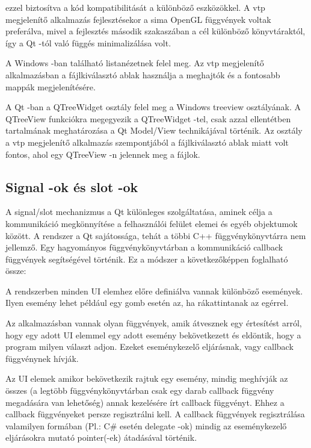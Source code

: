 \begin{sloppypar}
\begin{description}[font=\normalfont\itshape\bfseries\space]
ezzel biztosítva a kód kompatibilitását a különböző eszközökkel. 
A vtp megjelenítő alkalmazás fejlesztésekor 
a sima OpenGL függvények voltak preferálva,
mivel a fejlesztés második szakaszában a cél különböző könyvtáraktól, 
így a Qt -tól való függés minimalizálása volt.
\item [QListWidget:] 
A Windows -ban található listanézetnek felel meg. 
Az vtp megjelenítő alkalmazásban 
a fájlkiválasztó ablak használja a meghajtók és 
a fontosabb mappák megjelenítésére.
\item [QTreeView:] 
A Qt -ban a {\ttfamily QTreeWidget} osztály felel meg 
a Windows treeview osztályának. 
A {\ttfamily QTreeView} funkciókra megegyezik a {\ttfamily QTreeWidget} -tel, 
csak azzal ellentétben tartalmának meghatározása 
a Qt Model/View technikájával történik. 
Az osztály a vtp megjelenítő alkalmazás szempontjából
a fájlkiválasztó ablak miatt volt fontos,
ahol egy {\ttfamily QTreeView} -n jelennek meg a fájlok.
\end{description}
\end{sloppypar}

\subsection{Signal -ok és slot -ok}

A signal/slot mechanizmus a Qt különleges szolgáltatása, 
aminek célja a kommunikáció megkönnyítése a felhasználói felület elemei
és egyéb objektumok között. 
A rendszer a Qt sajátossága, 
tehát a többi C++ függvénykönyvtárra nem jellemző.
Egy hagyományos függvénykönyvtárban a kommunikáció 
callback függvények segítségével történik. 
Ez a módszer a következőképpen foglalható össze:

A rendszerben minden UI elemhez előre definiálva vannak különböző események. 
Ilyen esemény lehet például egy gomb esetén az, 
ha rákattintanak az egérrel.

Az alkalmazásban vannak olyan függvények, 
amik átvesznek egy értesítést arról, 
hogy egy adott UI elemmel egy adott esemény bekövetkezett
és eldöntik, hogy a program milyen választ adjon. 
Ezeket eseménykezelő eljárásnak, vagy callback függvénynek hívják.

Az UI elemek amikor bekövetkezik rajtuk egy esemény, 
mindig meghívják az összes 
(a legtöbb függvénykönyvtárban csak egy darab callback függvény megadására van lehetőség) 
annak kezelésére írt callback függvényt. 
Ehhez a callback függvényeket persze regisztrálni kell.
A callback függvények regisztrálása 
valamilyen formában (Pl.: C\# esetén delegate -ok) 
mindig az eseménykezelő eljárásokra mutató pointer(-ek) átadásával történik.

